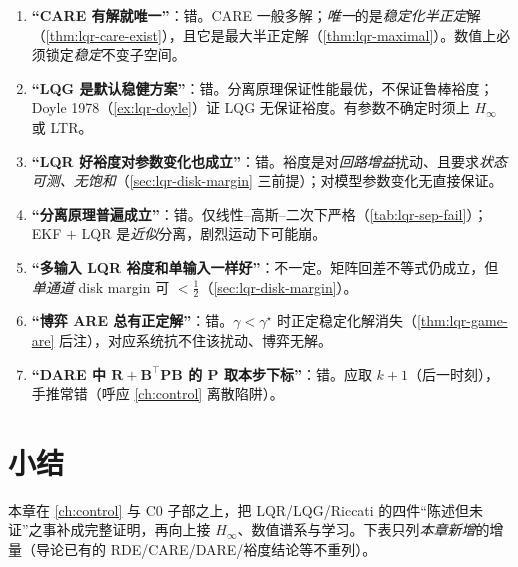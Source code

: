 \begin{enumerate}
  \item \textbf{“CARE 有解就唯一”}：错。CARE 一般多解；\emph{唯一}的是\emph{稳定化半正定}解（\cref{thm:lqr-care-exist}），且它是最大半正定解（\cref{thm:lqr-maximal}）。数值上必须锁定\emph{稳定}不变子空间。
  \item \textbf{“LQG 是默认稳健方案”}：错。分离原理保证性能最优，不保证鲁棒裕度；Doyle 1978（\cref{ex:lqr-doyle}）证 LQG 无保证裕度。有参数不确定时须上 $H_\infty$ 或 LTR。
  \item \textbf{“LQR 好裕度对参数变化也成立”}：错。裕度是对\emph{回路增益}扰动、且要求\emph{状态可测、无饱和}（\cref{sec:lqr-disk-margin} 三前提）；对模型参数变化无直接保证。
  \item \textbf{“分离原理普遍成立”}：错。仅线性--高斯--二次下严格（\cref{tab:lqr-sep-fail}）；EKF $+$ LQR 是\emph{近似}分离，剧烈运动下可能崩。
  \item \textbf{“多输入 LQR 裕度和单输入一样好”}：不一定。矩阵回差不等式仍成立，但\emph{单通道} disk margin 可 $<\tfrac12$（\cref{sec:lqr-disk-margin}）。
  \item \textbf{“博弈 ARE 总有正定解”}：错。$\gamma<\gamma^\star$ 时正定稳定化解消失（\cref{thm:lqr-game-are} 后注），对应系统抗不住该扰动、博弈无解。
  \item \textbf{“DARE 中 $\mathbf R+\mathbf B^\top\mathbf P\mathbf B$ 的 $\mathbf P$ 取本步下标”}：错。应取 $k+1$（后一时刻），手推常错（呼应 \cref{ch:control} 离散陷阱）。
\end{enumerate}

\section*{小结}

本章在 \cref{ch:control} 与 C0 子部之上，把 LQR/LQG/Riccati 的四件“陈述但未证”之事补成完整证明，再向上接 $H_\infty$、数值谱系与学习。下表只列\emph{本章新增}的增量（导论已有的 RDE/CARE/DARE/裕度结论等不重列）。

